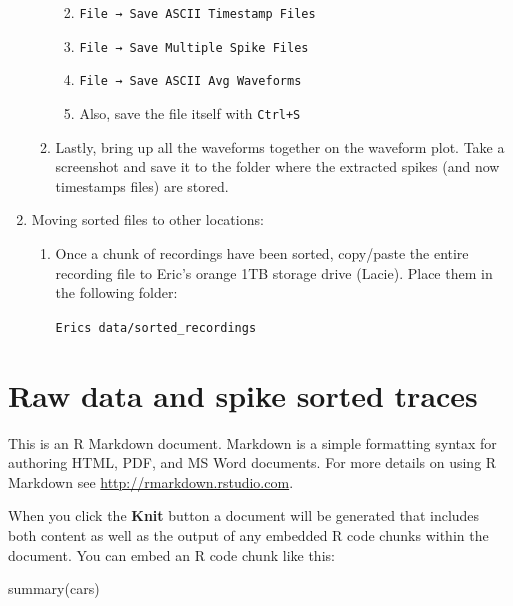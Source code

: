 \documentclass[
]{book}
\newenvironment{Shaded}{\begin{snugshade}}{\end{snugshade}}
\newcommand{\FunctionTok}[1]{\textcolor[rgb]{0.00,0.00,0.00}{#1}}
\newcommand{\NormalTok}[1]{#1}
\begin{document}
\begin{enumerate}
\begin{enumerate}
    \begin{enumerate}
    \def\labelenumiii{\arabic{enumiii}.}
    \item
      \texttt{File\ →\ Save\ ASCII\ Timestamp\ Files}
    \item
      \texttt{File\ →\ Save\ Multiple\ Spike\ Files}
    \item
      \texttt{File\ →\ Save\ ASCII\ Avg\ Waveforms}
    \item
      Also, save the file itself with \texttt{Ctrl+S}
    \end{enumerate}
  \item
    Lastly, bring up all the waveforms together on the waveform plot. Take a
    screenshot and save it to the folder where the extracted spikes (and now
    timestamps files) are stored.
  \end{enumerate}
\item
  Moving sorted files to other locations:

  \begin{enumerate}
  \def\labelenumii{\arabic{enumii}.}
  \item
    Once a chunk of recordings have been sorted, copy/paste the entire
    recording file to Eric's orange 1TB storage drive (Lacie). Place them in
    the following folder:

    \texttt{Eric\textquotesingle{}s\ data/sorted\_recordings}
  \end{enumerate}
\end{enumerate}

\hypertarget{raw-data-and-spike-sorted-traces}{%
\chapter{Raw data and spike sorted traces}\label{raw-data-and-spike-sorted-traces}}

This is an R Markdown document. Markdown is a simple formatting syntax for authoring HTML, PDF, and MS Word documents. For more details on using R Markdown see \url{http://rmarkdown.rstudio.com}.

When you click the \textbf{Knit} button a document will be generated that includes both content as well as the output of any embedded R code chunks within the document. You can embed an R code chunk like this:

\begin{Shaded}
\begin{Highlighting}[]
\FunctionTok{summary}\NormalTok{(cars)}
\end{Highlighting}
\end{Shaded}
\end{document}
